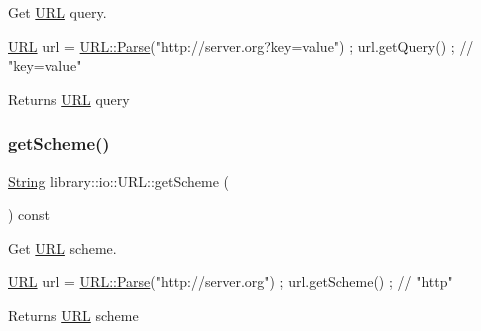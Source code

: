 Get \hyperlink{classlibrary_1_1io_1_1_u_r_l}{U\+RL} query. 


\begin{DoxyCode}
\hyperlink{classlibrary_1_1io_1_1_u_r_l_a7e9c070138a6dbd000ffb10b7cd8a5c4}{URL} url = \hyperlink{classlibrary_1_1io_1_1_u_r_l_a98cf42141cf75e1dd5362eb208a1e2bd}{URL::Parse}(\textcolor{stringliteral}{"http://server.org?key=value"}) ;
url.getQuery() ; \textcolor{comment}{// "key=value"}
\end{DoxyCode}


\begin{DoxyReturn}{Returns}
\hyperlink{classlibrary_1_1io_1_1_u_r_l}{U\+RL} query 
\end{DoxyReturn}
\mbox{\label{classlibrary_1_1io_1_1_u_r_l_ab36d8bd486f69fc44cfd5aa4e337e3b2}} 
\subsubsection{\texorpdfstring{get\+Scheme()}{getScheme()}}
{\footnotesize\ttfamily \hyperlink{namespacelibrary_1_1io_a7469b45835a4421045db344d6a5a1f85}{String} library\+::io\+::\+U\+R\+L\+::get\+Scheme (\begin{DoxyParamCaption}{ }\end{DoxyParamCaption}) const}



Get \hyperlink{classlibrary_1_1io_1_1_u_r_l}{U\+RL} scheme. 


\begin{DoxyCode}
\hyperlink{classlibrary_1_1io_1_1_u_r_l_a7e9c070138a6dbd000ffb10b7cd8a5c4}{URL} url = \hyperlink{classlibrary_1_1io_1_1_u_r_l_a98cf42141cf75e1dd5362eb208a1e2bd}{URL::Parse}(\textcolor{stringliteral}{"http://server.org"}) ;
url.getScheme() ; \textcolor{comment}{// "http"}
\end{DoxyCode}


\begin{DoxyReturn}{Returns}
\hyperlink{classlibrary_1_1io_1_1_u_r_l}{U\+RL} scheme 
\end{DoxyReturn}
\mbox{\label{classlibrary_1_1io_1_1_u_r_l_ae79c849e58c983a0991c7c75bb565596}} 
